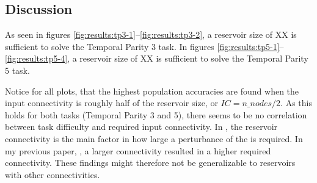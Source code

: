 \subsection{Discussion}

As seen in figures \ref{fig:results:tp3-1}–\ref{fig:results:tp3-2},
a reservoir size of XX is sufficient to solve the Temporal Parity 3 task.
In figures \ref{fig:results:tp5-1}–\ref{fig:results:tp5-4},
a reservoir size of XX is sufficient to solve the Temporal Parity 5 task.

Notice for all plots, that the highest population accuracies are found when the input connectivity is roughly half of the reservoir size, or $IC=n\_nodes/2$.
As this holds for both tasks (Temporal Parity 3 and 5), there seems to be no correlation between task difficulty and required input connectivity.
In , the reservoir connectivity is the main factor in how large a perturbance of the is required.
In my previous paper, , a larger connectivity resulted in a higher required connectivity.
These findings might therefore not be generalizable to reservoirs with other connectivities.
